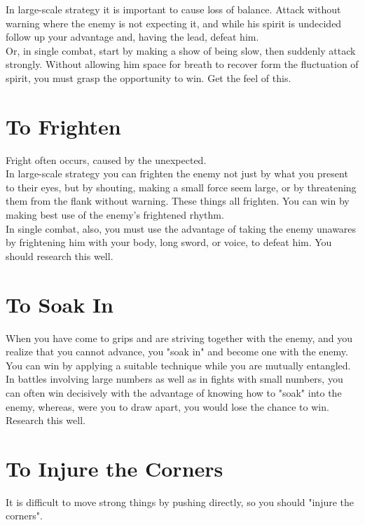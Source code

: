 In large-scale strategy it is important to cause loss of balance. Attack without warning where the enemy is not expecting it, and while his spirit is undecided follow up your advantage and, having the lead, defeat him.\\

Or, in single combat, start by making a show of being slow, then suddenly attack strongly. Without allowing him space for breath to recover form the fluctuation of spirit, you must grasp the opportunity to win. Get the feel of this.
\section{To Frighten}

Fright often occurs, caused by the unexpected.\\

In large-scale strategy you can frighten the enemy not just by what you present to their eyes, but by shouting, making a small force seem large, or by threatening them from the flank without warning. These things all frighten. You can win by making best use of the enemy's frightened rhythm.\\

In single combat, also, you must use the advantage of taking the enemy unawares by frightening him with your body, long sword, or voice, to defeat him. You should research this well.\\
\section{To Soak In}

When you have come to grips and are striving together with the enemy, and you realize that you cannot advance, you "soak in" and become one with the enemy. You can win by applying a suitable technique while you are mutually entangled.\\

In battles involving large numbers as well as in fights with small numbers, you can often win decisively with the advantage of knowing how to "soak" into the enemy, whereas, were you to draw apart, you would lose the chance to win. Research this well.\\
\section{To Injure the Corners}

It is difficult to move strong things by pushing directly, so you should "injure the corners".\\

